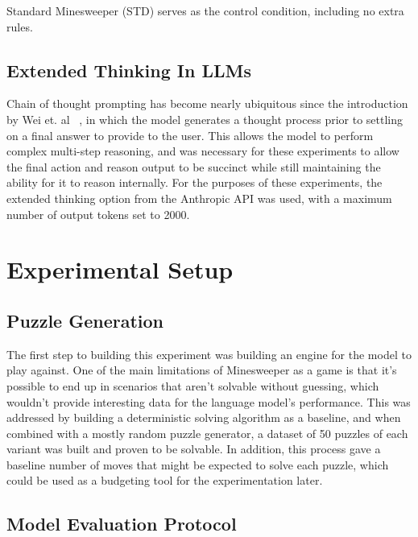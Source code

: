 \documentclass[11pt,conference,compsoc]{IEEEtran}
\begin{document}
Standard Minesweeper (STD) serves as the control condition, including no extra rules.

\subsection{Extended Thinking In LLMs}
Chain of thought prompting has become nearly ubiquitous since the introduction by Wei et. al ~\cite{wei2022chain}, in which the model generates a thought process prior to settling on a final answer to provide to the user. This allows the model to perform complex multi-step reasoning, and was necessary for these experiments to allow the final action and reason output to be succinct while still maintaining the ability for it to reason internally. For the purposes of these experiments, the extended thinking option from the Anthropic API was used, with a maximum number of output tokens set to 2000.

\section{Experimental Setup}
\subsection{Puzzle Generation}
The first step to building this experiment was building an engine for the model to play against. One of the main limitations of Minesweeper as a game is that it's possible to end up in scenarios that aren't solvable without guessing, which wouldn't provide interesting data for the language model's performance. This was addressed by building a deterministic solving algorithm as a baseline, and when combined with a mostly random puzzle generator, a dataset of 50 puzzles of each variant was built and proven to be solvable. In addition, this process gave a baseline number of moves that might be expected to solve each puzzle, which could be used as a budgeting tool for the experimentation later.

\subsection{Model Evaluation Protocol}
\end{document}
